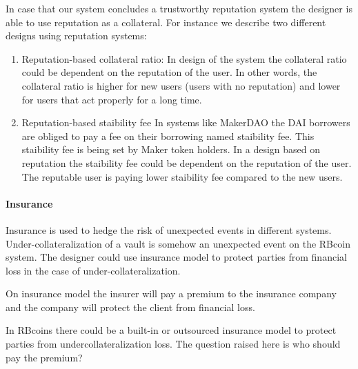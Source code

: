 In case that our system concludes a trustworthy reputation system the designer is able to use reputation as a collateral. For instance we describe two different designs using reputation systems:
\begin{enumerate}
	\item Reputation-based collateral ratio: 
	In design of the system the collateral ratio could be dependent on the reputation of the user. In other words, the collateral ratio is higher for new users (users with no reputation) and lower for users that act properly for a long time.
	\item Reputation-based staibility fee
In systems like MakerDAO the DAI borrowers are obliged to pay a fee on their borrowing named staibility fee. This staibility fee is being set by Maker token holders.
	In a design based on reputation the staibility fee could be dependent on the reputation of the user. The reputable user is paying lower staibility fee compared to the new users.
\end{enumerate}
 
\paragraph{Insurance}

Insurance is used to hedge the risk of unexpected events in different systems. Under-collateralization of a vault is somehow an unexpected event on the RBcoin system. The designer could use insurance model to protect parties from financial loss in the case of under-collateralization. 

On insurance model the insurer will pay a premium to the insurance company and the company will protect the client from financial loss. 

In RBcoins there could be a built-in or outsourced insurance model to protect parties from undercollateralization loss. The question raised here is who should pay the premium?

